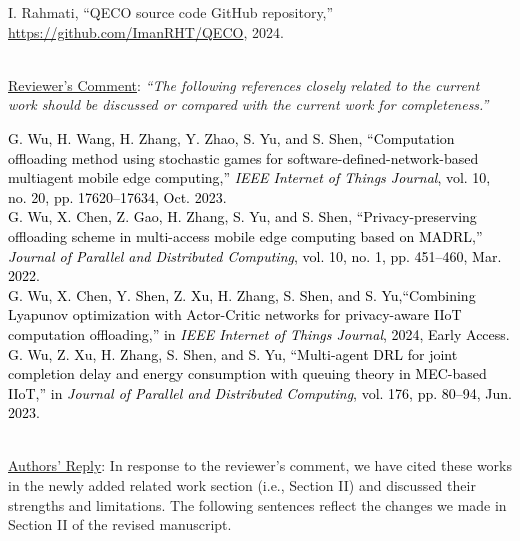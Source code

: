 \documentclass[12pt,draftclsnofoot,onecolumn]{IEEEtran}
\newcommand{\rev}[1]{{\color{blue}#1}} %
\newcommand{\rev}[1]{#1}
\newenvironment{my}[2]%
{\begin{list}{}%
{\setlength{\rightmargin}{#1}\setlength{\leftmargin}{#2}}%


 \item[]{}

} {\end{list}}
\begin{document}
\begin{enumerate}
		\begin{my}{1cm}{1cm}
	\rev{
		{\small
			\noindent\hspace{-0.5mm}\cite{QECO} I. Rahmati, ``QECO source code GitHub repository,'' \url{https://github.com/ImanRHT/QECO}, 2024.\\[6pt]}\\}
\end{my}



	\item \underline{Reviewer's Comment}: 
	\textit{``The following references closely related to the current work should be discussed or compared with the current work for completeness.''} \newline
		\begin{my}{1cm}{1cm}
		\rev{ 
			{\small
				\noindent\hspace{-1.8mm} \cite{wu2023computation} \textcolor{black}{G. Wu, H. Wang, H. Zhang, Y. Zhao, S. Yu, and S. Shen, ``Computation offloading method using stochastic games for software-defined-network-based multiagent mobile edge computing,'' \textit{IEEE Internet of Things Journal}, vol. 10, no. 20, pp. 17620–17634, Oct. 2023.}\\[6pt]
				\cite{wu2024privacy} \textcolor{black}{G. Wu, X. Chen, Z. Gao, H. Zhang, S. Yu, and S. Shen, ``Privacy-preserving offloading scheme in multi-access mobile edge computing based on MADRL,'' \textit{Journal of Parallel and Distributed Computing}, vol. 10, no. 1, pp. 451--460, Mar. 2022.}\\[6pt]
				\cite{wu2024combining}  \textcolor{black}{G. Wu, X. Chen, Y. Shen, Z. Xu, H. Zhang, S. Shen, and S. Yu,``Combining Lyapunov optimization with Actor-Critic networks for privacy-aware IIoT computation offloading,'' in \textit{IEEE Internet of Things Journal}, 2024, Early Access.}\\[6pt]
				\cite{wu2023multi} \textcolor{black}{G. Wu, Z. Xu, H. Zhang, S. Shen, and S. Yu,  ``Multi-agent DRL for joint completion delay and energy consumption with queuing theory in MEC-based IIoT,'' in \textit{Journal of Parallel and Distributed Computing}, vol. 176, pp. 80–94, Jun. 2023.}\\[6pt]}\\}
	\end{my}

	\underline{Authors' Reply}: In response to the reviewer's comment, we have cited these works in the newly added related work section (i.e., Section II) and discussed their strengths and limitations. The following sentences reflect the changes we made in Section II of the revised manuscript. \vspace{5mm}
	

\end{enumerate}
\end{document}
